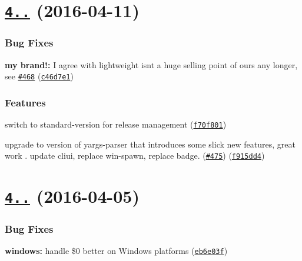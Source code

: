 \label{_4.6.0}%
 \section*{\href{https://github.com/yargs/yargs/compare/v4.5.0...v4.6.0}{\tt 4..} (2016-\/04-\/11)}

\subsubsection*{Bug Fixes}


\begin{DoxyItemize}
\item {\bfseries my brand!\+:} I agree with \href{https://github.com/osher}{\tt } lightweight isn\textquotesingle{}t a huge selling point of ours any longer, see \href{https://github.com/yargs/yargs/issues/468}{\tt \#468} (\href{https://github.com/yargs/yargs/commit/c46d7e1}{\tt c46d7e1})
\end{DoxyItemize}

\subsubsection*{Features}


\begin{DoxyItemize}
\item switch to standard-\/version for release management (\href{https://github.com/yargs/yargs/commit/f70f801}{\tt f70f801})
\item upgrade to version of yargs-\/parser that introduces some slick new features, great work \href{https://github.com/elas7}{\tt }. update cliui, replace win-\/spawn, replace badge. (\href{https://github.com/yargs/yargs/issues/475}{\tt \#475}) (\href{https://github.com/yargs/yargs/commit/f915dd4}{\tt f915dd4})
\end{DoxyItemize}

\label{_4.5.0}%
 \section*{\href{https://github.com/yargs/yargs/compare/v4.4.0...v4.5.0}{\tt 4..} (2016-\/04-\/05)}

\subsubsection*{Bug Fixes}


\begin{DoxyItemize}
\item {\bfseries windows\+:} handle \$0 better on Windows platforms (\href{https://github.com/yargs/yargs/commit/eb6e03f}{\tt eb6e03f})
\end{DoxyItemize}


